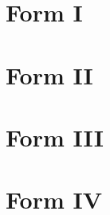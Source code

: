 \documentclass[11pt, a4paper]{report}
\begin{document}

\newpage
\tableofcontents
\newpage

\chapter{Form I}

\newpage

\chapter{Form II}

\newpage

\newpage

\newpage

\newpage


\chapter{Form III}

\newpage

\newpage

\newpage

\newpage


\chapter{Form IV}

\newpage
\end{document}
